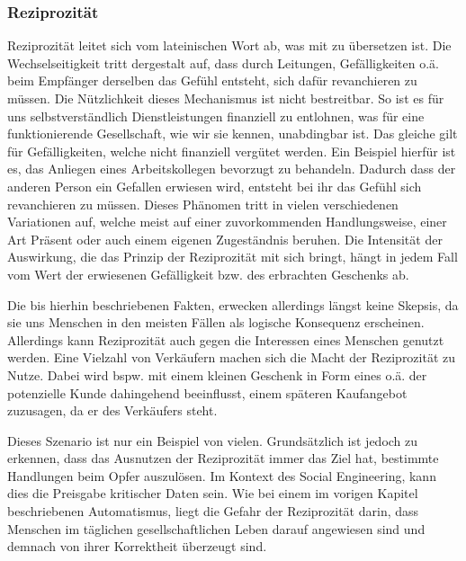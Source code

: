 \subsubsection{Reziprozität}\label{sec:reziprozität}
Reziprozität leitet sich vom lateinischen Wort  ab, was mit  zu übersetzen ist.
Die Wechselseitigkeit tritt dergestalt auf, dass durch Leitungen, Gefälligkeiten o.ä. beim Empfänger derselben das Gefühl entsteht, sich dafür revanchieren zu müssen.
Die Nützlichkeit dieses Mechanismus ist nicht bestreitbar.
So ist es für uns selbstverständlich Dienstleistungen finanziell zu entlohnen, was für eine funktionierende Gesellschaft, wie wir sie kennen, unabdingbar ist.
Das gleiche gilt für Gefälligkeiten, welche nicht finanziell vergütet werden. Ein Beispiel hierfür ist es, das Anliegen eines Arbeitskollegen bevorzugt zu behandeln. Dadurch dass der anderen Person ein Gefallen erwiesen wird, entsteht bei ihr das Gefühl sich revanchieren zu müssen.
Dieses Phänomen tritt in vielen verschiedenen Variationen auf, welche meist auf einer zuvorkommenden Handlungsweise, einer Art Präsent oder auch einem eigenen Zugeständnis beruhen. Die Intensität der Auswirkung, die das Prinzip der Reziprozität mit sich bringt, hängt in jedem Fall vom Wert der erwiesenen Gefälligkeit bzw. des erbrachten Geschenks ab.

Die bis hierhin beschriebenen Fakten, erwecken allerdings längst keine Skepsis, da sie uns Menschen in den meisten Fällen als logische Konsequenz erscheinen. Allerdings kann Reziprozität auch gegen die Interessen eines Menschen genutzt werden. Eine Vielzahl von Verkäufern machen sich die Macht der Reziprozität zu Nutze. 
Dabei wird bspw. mit einem kleinen Geschenk in Form eines  o.ä. der potenzielle Kunde dahingehend beeinflusst, einem späteren Kaufangebot zuzusagen, da er  des Verkäufers steht. \cite{cialdini}

Dieses Szenario ist nur ein Beispiel von vielen. Grundsätzlich ist jedoch zu erkennen, dass das Ausnutzen der Reziprozität immer das Ziel hat, bestimmte Handlungen beim Opfer auszulösen. Im Kontext des Social Engineering, kann dies die Preisgabe kritischer Daten sein. Wie bei einem im vorigen Kapitel beschriebenen Automatismus, liegt die Gefahr der Reziprozität darin, dass Menschen im täglichen gesellschaftlichen Leben darauf angewiesen sind und demnach von ihrer Korrektheit überzeugt sind.


